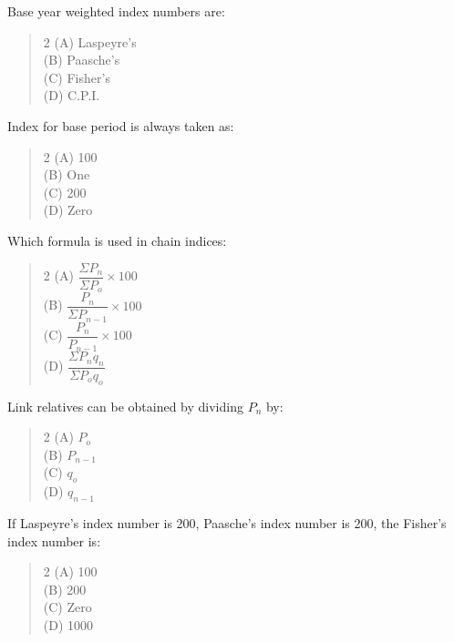 \documentclass[11pt,a4paper]{article}
\begin{document}
\begin{mcqlist}
\item Base year weighted index numbers are:
\begin{quote}\begin{multicols}{2}
\noindent (A) Laspeyre's \\
(B) Paasche's \\
(C) Fisher's \\
(D) C.P.I.
\end{multicols}\end{quote}

\item Index for base period is always taken as:
\begin{quote}\begin{multicols}{2}
\noindent (A) 100 \\
(B) One \\
(C) 200 \\
(D) Zero
\end{multicols}\end{quote}

\item Which formula is used in chain indices:
\begin{quote}\begin{multicols}{2}
\noindent (A) $\dfrac{\Sigma P_n}{\Sigma P_o}\times 100$ \\
(B) $\dfrac{P_n}{\Sigma P_{n-1}}\times 100$ \\
(C) $\dfrac{P_n}{P_{n-1}}\times 100$ \\
(D) $\dfrac{\Sigma P_nq_n}{\Sigma P_oq_o}$
\end{multicols}\end{quote}

\item Link relatives can be obtained by dividing $P_n$ by:
\begin{quote}\begin{multicols}{2}
\noindent (A) $P_o$ \\
(B) $P_{n-1}$ \\
(C) $q_o$ \\
(D) $q_{n-1}$
\end{multicols}\end{quote}

\item If Laspeyre's index number is 200, Paasche's index number is 200, the Fisher's index number is:
\begin{quote}\begin{multicols}{2}
\noindent (A) 100 \\
(B) 200 \\
(C) Zero \\
(D) 1000
\end{multicols}\end{quote}


\end{mcqlist}
\end{document}
